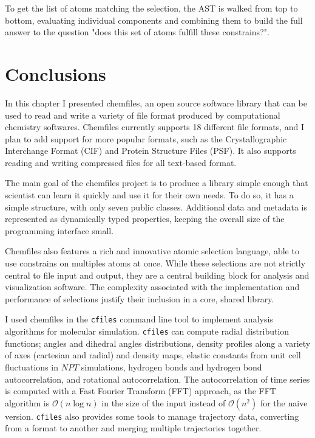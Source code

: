 \documentclass[thesis]{subfiles}
\begin{document}
To get the list of atoms matching the selection, the AST is walked from top to
bottom, evaluating individual components and combining them to build the full
answer to the question "does this set of atoms fulfill these constrains?".

\section*{Conclusions}

In this chapter I presented chemfiles, an open source \cxx software library
that can be used to read and write a variety of file format produced by
computational chemistry softwares. Chemfiles currently supports 18 different
file formats, and I plan to add support for more popular formats, such as the
Crystallographic Interchange Format (CIF) and Protein Structure Files (PSF). It
also supports reading and writing compressed files for all text-based format.

The main goal of the chemfiles project is to produce a library simple enough
that scientist can learn it quickly and use it for their own needs. To do so, it
has a simple structure, with only seven public classes. Additional data and
metadata is represented as dynamically typed properties, keeping the overall
size of the programming interface small.

Chemfiles also features a rich and innovative atomic selection language, able to
use constrains on multiples atoms at once. While these selections are not
strictly central to file input and output, they are a central building block for
analysis and visualization software. The complexity associated with the
implementation and performance of selections justify their inclusion in a core,
shared library.

I used chemfiles in the \texttt{cfiles} command line tool to implement analysis
algorithms for molecular simulation. \texttt{cfiles} can compute radial
distribution functions; angles and dihedral angles distributions, density
profiles along a variety of axes (cartesian and radial) and density maps,
elastic constants from unit cell fluctuations in $NPT$
simulations\cite{Clavier2017}, hydrogen bonds and hydrogen bond autocorrelation,
and rotational autocorrelation. The autocorrelation of time series is computed
with a Fast Fourier Transform (FFT) approach, as the FFT algorithm is
$\mathcal{O}(n \log n)$ in the size of the input instead of $\mathcal{O}(n^2)$
for the naive version\cite{Kneller1995}. \texttt{cfiles} also provides some
tools to manage trajectory data, converting from a format to another and merging
multiple trajectories together.

\OnlyInSubfile{\printglobalbibliography}
\end{document}
